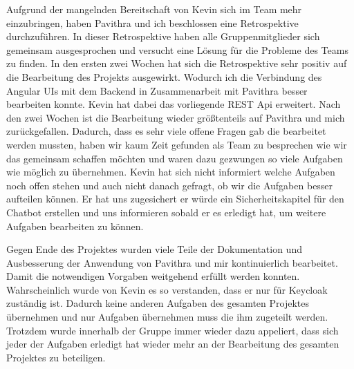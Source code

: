 \noindent Aufgrund der mangelnden Bereitschaft von Kevin sich im Team mehr einzubringen, haben Pavithra und ich beschlossen eine Retrospektive durchzuführen.
In dieser Retrospektive haben alle Gruppenmitglieder sich gemeinsam ausgesprochen und versucht eine Lösung für die Probleme des Teams zu finden.
In den ersten zwei Wochen hat sich die Retrospektive sehr positiv auf die Bearbeitung des Projekts ausgewirkt.
Wodurch ich die Verbindung des Angular UIs mit dem Backend in Zusammenarbeit mit Pavithra besser bearbeiten konnte.
Kevin hat dabei das vorliegende REST Api erweitert. Nach den zwei Wochen ist die Bearbeitung wieder größtenteils auf Pavithra und mich zurückgefallen.
Dadurch, dass es sehr viele offene Fragen gab die bearbeitet werden mussten,
haben wir kaum Zeit gefunden als Team zu besprechen wie wir das gemeinsam schaffen möchten und waren dazu gezwungen so viele Aufgaben wie möglich zu übernehmen.
Kevin hat sich nicht informiert welche Aufgaben noch offen stehen und auch nicht danach gefragt, ob wir die Aufgaben besser aufteilen können.
Er hat uns zugesichert er würde ein Sicherheitskapitel für den Chatbot erstellen und uns informieren sobald er es erledigt hat, um weitere Aufgaben bearbeiten zu können.

\noindent Gegen Ende des Projektes wurden viele Teile der Dokumentation und Ausbesserung der Anwendung von Pavithra und mir kontinuierlich bearbeitet.
Damit die notwendigen Vorgaben weitgehend erfüllt werden konnten.
Wahrscheinlich wurde von Kevin es so verstanden, dass er nur für Keycloak zuständig ist. 
Dadurch keine anderen Aufgaben des gesamten Projektes übernehmen und nur Aufgaben übernehmen muss die ihm zugeteilt werden.
Trotzdem wurde innerhalb der Gruppe immer wieder dazu appeliert, dass sich jeder der Aufgaben erledigt hat wieder mehr an der Bearbeitung des gesamten Projektes zu beteiligen.

